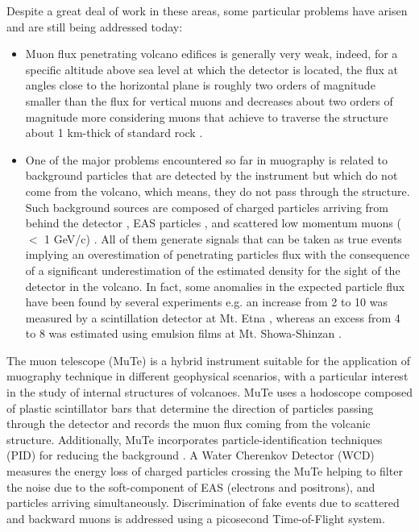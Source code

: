 \documentclass[letterpaper,11pt]{article}
\begin{document}
Despite a great deal of work in these areas, some particular problems have arisen and are still being addressed today:
\begin{itemize}

\item Muon flux penetrating volcano edifices is generally very weak, indeed, for a specific altitude above sea level at which the detector is located, the flux at angles close to the horizontal plane is roughly two orders of magnitude smaller than the flux for vertical muons and decreases about two orders of magnitude more considering muons that achieve to traverse the structure about 1 km-thick of standard rock \cite{groom2001muon, groom2000passage}. 


\item One of the major problems encountered so far in muography is related to background particles that are detected by the instrument but which do not come from the volcano, which means, they do not pass through the structure. Such background sources are composed of charged particles arriving from behind the detector \cite{jourde2013experimental}, EAS particles \cite{nishiyama2014experimental, Olah2017ICRC, KUSAGAYA2015, Bene2013, Olh2017}, and scattered low momentum muons ($<$ 1 GeV/c) \cite{nishiyama2016monte, Gomez2017, Olh2018, Olah2018Invest, ambrosino2015joint}. All of them generate signals that can be taken as true events implying an overestimation of penetrating particles flux with the consequence of a significant underestimation of the estimated density for the sight of the detector in the volcano. In fact, some anomalies in the expected particle flux have been found by several experiments e.g. an increase from 2 to 10 was measured by a scintillation detector at Mt. Etna \cite{carbone2013experiment}, whereas an excess from 4 to 8 was estimated using emulsion films at Mt. Showa-Shinzan \cite{nishiyama2016monte}.
\end{itemize}



The muon telescope (MuTe) \cite{AsoreyEtal2017B, SierraPortaEtal2018} is a hybrid instrument suitable for the application of muography technique in different geophysical scenarios, with a particular interest in the study of internal structures of volcanoes. MuTe uses a hodoscope composed of plastic scintillator bars that determine the direction of particles passing through the detector and records the muon flux coming from the volcanic structure. Additionally, MuTe incorporates particle-identification techniques (PID) for reducing the background \cite{Bonechi2020, pena2019calibration}. A Water Cherenkov Detector (WCD) measures the energy loss of charged particles crossing the MuTe helping to filter the noise due to the soft-component of EAS (electrons and positrons), and particles arriving simultaneously. Discrimination of fake events due to scattered and backward muons is addressed using a picosecond Time-of-Flight system.
\end{document}
